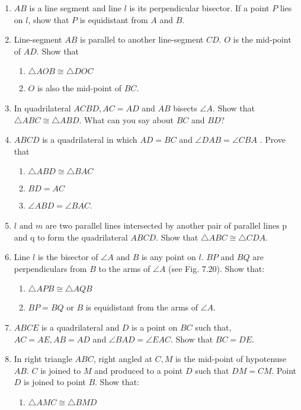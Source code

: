 \begin{enumerate}[label=\arabic*.,ref=\thesubsection.\theenumi]
%
\item $AB$ is a line segment and line $l$ is its perpendicular bisector. If a point $P$ lies on $l$, show that $P$ is equidistant from $A$ and $B$.
\item Line-segment $AB$ is parallel to another line-segment $CD$. $O$ is the mid-point of $AD$. Show that 
\begin{enumerate}
\item  $\triangle AOB \cong \triangle DOC$ 
\item  $O$ is also the mid-point of $BC$.
\end{enumerate}
%
\item In quadrilateral $ACBD, AC = AD$ and $AB$ bisects $\angle  A$. Show that $\triangle  ABC \cong \triangle  ABD$. What can you say about $BC$ and $BD$?
%
\item $ABCD$ is a quadrilateral in which $AD = BC$ and $\angle  DAB = \angle  CBA$ . Prove that
\begin{enumerate}
\item  $\triangle  ABD \cong  \triangle  BAC $
\item $ BD = AC $
\item  $\angle  ABD = \angle  BAC$.
\end{enumerate}
%
\item $l$ and $m$ are two parallel lines intersected by another pair of parallel lines p and q 
to form the quadrilateral $ABCD$. Show that $\triangle  ABC \cong  \triangle  CDA$.
%
\item Line $l$ is the bisector of $ \angle  A$ and $B$ is any point on $l$. $BP$ and $BQ$ are perpendiculars from $B$ to the arms of $\angle  A$ (see Fig. 7.20). Show that: 
\begin{enumerate}
\item  $\triangle  APB \cong  \triangle  AQB$ 
\item  $BP = BQ$ or $B$ is equidistant from the arms of $\angle  A$.
\end{enumerate}
%
\item $ABCE$ is a quadrilateral and $D$ is a point on $BC$ such that, $AC = AE, AB = AD$ and $\angle  BAD = \angle  EAC$. Show that $BC = DE$.
%
\item In right triangle $ABC$, right angled at $C, M$ is the mid-point of hypotenuse $AB$. $C$ is joined to $M$ and produced to a point $D$ such that $DM = CM$. Point $D$ is joined to point $B$.
Show that: 
\begin{enumerate}
\item $ \triangle  AMC \cong  \triangle  BMD $

\end{enumerate}
\end{enumerate}
